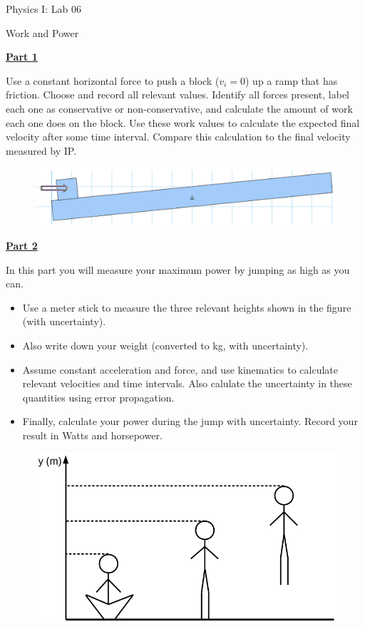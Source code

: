 \documentclass[12pt]{article}
\begin{document}
{\centering
\large Physics I: Lab 06 \par
\large Work and Power \par
}
\hfill \break \vspace{-4mm}

\underline{\textbf{Part 1}} \par
Use a constant horizontal force to push a block ($v_i = 0$) up a ramp that has friction.
Choose and record all relevant values.
Identify all forces present, label each one as conservative or non-conservative, and calculate the amount of work each one does on the block.
Use these work values to calculate the expected final velocity after some time interval.
Compare this calculation to the final velocity measured by IP.

%
\begin{figure}[H]
\includegraphics[scale=0.50]{figures/fig1.png}
\end{figure}
%

\underline{\textbf{Part 2}} \par

In this part you will measure your maximum power by jumping as high as you can.
\begin{itemize}
\item Use a meter stick to measure the three relevant heights shown in the figure (with uncertainty).
\item Also write down your weight (converted to kg, with uncertainty).
\item Assume constant acceleration and force, and use kinematics to calculate relevant velocities and time intervals. Also calulate the uncertainty in these quantities using error propagation.
\item Finally, calculate your power during the jump with uncertainty. Record your result in Watts and horsepower.
\end{itemize}

%
\begin{figure}[H]
\includegraphics[scale=0.50]{figures/fig2.png}
\end{figure}
%
\end{document}
